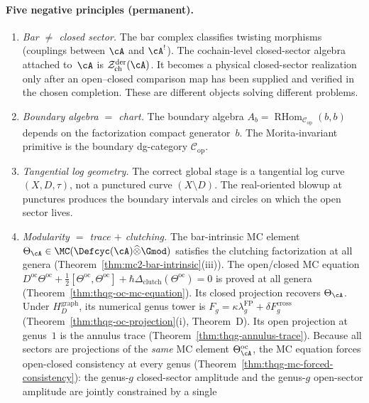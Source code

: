 \paragraph{Five negative principles (permanent).}
\label{par:concordance-five-negative-principles}
\begin{enumerate}[label=\textup{(N\arabic*)}]
\item \emph{Bar $\neq$ closed sector.}
 The bar complex classifies twisting morphisms
 (couplings between $\cA$ and $\cA^!$).
 The cochain-level closed-sector algebra attached to~$\cA$ is
 $\mathcal{Z}^{\mathrm{der}}_{\mathrm{ch}}(\cA)$.
 It becomes a physical closed-sector realization only after an
 open--closed comparison map has been supplied and verified in the
 chosen completion.
 These are different objects solving different problems.
\item \emph{Boundary algebra $=$ chart.}
 The boundary algebra
 $A_b=\operatorname{RHom}_{\mathcal C_{\mathrm{op}}}(b,b)$ depends on
 the factorization compact generator~$b$.
 The Morita-invariant primitive is the boundary
 dg-category $\mathcal{C}_{\mathrm{op}}$.
\item \emph{Tangential log geometry.}
 The correct global stage is a tangential log curve $(X, D, \tau)$,
 not a punctured curve $(X \setminus D)$.
 The real-oriented blowup at punctures produces the boundary
 intervals and circles on which the open sector lives.
\item \emph{Modularity $=$ trace $+$ clutching.}
 The bar-intrinsic MC element
 $\Theta_\cA \in \MC(\Defcyc(\cA) \widehat{\otimes} \Gmod)$
 satisfies the clutching factorization at all genera
 (Theorem~\ref{thm:mc2-bar-intrinsic}(iii)).
 The open/closed MC equation
 $D^{\mathrm{oc}}\Theta^{\mathrm{oc}} + \tfrac{1}{2}[\Theta^{\mathrm{oc}},
 \Theta^{\mathrm{oc}}] + \hbar\Delta_{\mathrm{clutch}}(\Theta^{\mathrm{oc}}) = 0$
 is proved at all genera
 (Theorem~\ref{thm:thqg-oc-mc-equation}).
 Its closed projection recovers $\Theta_\cA$.  Under
 $H_D^{\mathrm{graph}}$, its numerical genus tower is
 $F_g=\kappa\lambda_g^{\mathrm{FP}}
 +\delta F_g^{\mathrm{cross}}$
 (Theorem~\ref{thm:thqg-oc-projection}(i), Theorem~D).
 Its open projection at genus~$1$ is the annulus trace
 (Theorem~\ref{thm:thqg-annulus-trace}).
 Because all sectors are projections of the \emph{same} MC element
 $\Theta^{\mathrm{oc}}_\cA$, the MC equation forces open-closed
 consistency at every genus
 (Theorem~\ref{thm:thqg-mc-forced-consistency}):
 the genus-$g$ closed-sector amplitude and the genus-$g$
 open-sector amplitude are jointly constrained by a single

\end{enumerate}
